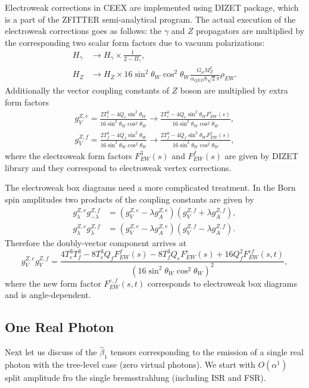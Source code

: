 Electroweak corrections in CEEX are implemented using DIZET package, which is a part of the ZFITTER semi-analytical program. The actual execution of the electroweak corrections goes as follows: the $\gamma$ and $Z$ propagators are multiplied by the corresponding two scalar form factors due to vacuum polarizations:
\begin{align}
H_\gamma&\to H_\gamma\times\frac{1}{2-\Pi_\gamma},\nonumber\\
H_Z&\to H_Z\times 16\sin^2\theta_W\cos^2\theta_W\frac{G_\mu M^2_Z}{\alpha_{QED}8\sqrt{2}\pi}\rho_{EW}.
\end{align}
Additionally the vector coupling constants of $Z$ boson are multiplied by extra form factors
\begin{eqnarray}
g^{Z,e}_V=\frac{2T^3_e-4Q_e\sin^2\theta_W}{16\sin^2\theta_W\cos^2\theta_W}\to\frac{2T^3_e-4Q_e\sin^2\theta_WF^e_{EW}(s)}{16\sin^2\theta_W\cos^2\theta_W},\nonumber\\ g^{Z,f}_V=\frac{2T^3_f-4Q_f\sin^2\theta_W}{16\sin^2\theta_W\cos^2\theta_W}\to\frac{2T^3_f-4Q_f\sin^2\theta_WF^f_{EW}(s)}{16\sin^2\theta_W\cos^2\theta_W},
\end{eqnarray}
where the electroweak form factors $F^3_{EW}(s)$ and $F^f_{EW}(s)$ are given by DIZET library and they correspond to electroweak vertex corrections.

The electroweak box diagrams need a more complicated treatment. In the Born spin amplitudes two products of the coupling constants are given by 
\begin{align}
g^{Z,e}_\lambda g^{Z,f}_{-\lambda}&=(g^{Z,e}_V-\lambda g^{Z,e}_A)(g^{Z,f}_V+\lambda g^{Z,f}_A),\nonumber\\
g^{Z,e}_\lambda g^{Z,f}_{\lambda}&=(g^{Z,e}_V-\lambda g^{Z,e}_A)(g^{Z,f}_V-\lambda g^{Z,f}_A).
\end{align}
Therefore the doubly-vector component arrives at
\begin{equation}
g^{Z,e}_Vg^{Z,f}_V=\frac{4T_e^3T^3_f-8T^3_eQ_fF^f_{EW}(s)-8T^3_fQ_eF^e_{EW}(s)+16Q_f^2F^{ef}_{EW}(s,t)}{(16\sin^2\theta_W\cos^2\theta_W)^2},
\end{equation}
where the new form factor $F^{e,f}_{EW}(s,t)$ corresponds to electroweak box diagrams and is angle-dependent. 


\subsection{One Real Photon}
Next let us discuss of the $\hat{\beta}_1$ tensors corresponding to the emission of a single real photon with the tree-level case (zero virtual photons). We start with $O(\alpha^1)$ split amplitude fro the single bremsstrahlung (including ISR and FSR). 

